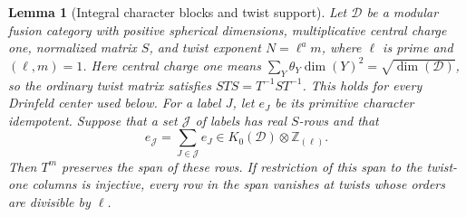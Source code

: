 \documentclass[11pt,a4paper]{article}
\newtheorem{lemma}[theorem]{Lemma}
\numberwithin{equation}{section}
\begin{document}
\begin{lemma}[Integral character blocks and twist support]
\label{lem:prime-local-block}
Let $\mathcal D$ be a modular fusion category with positive spherical
dimensions, multiplicative central charge one, normalized matrix $S$,
and twist exponent
$N=\ell^a m$, where $\ell$ is prime and $(\ell,m)=1$.
Here central charge one means
$\sum_Y\theta_Y\dim(Y)^2=\sqrt{\dim(\mathcal D)}$, so the ordinary
twist matrix satisfies $STS=T^{-1}ST^{-1}$. This holds for every
Drinfeld center used below. For a label $J$, let $e_J$ be its
primitive character idempotent.
Suppose that a set $\mathcal J$ of labels has real $S$-rows and that
\[
 e_{\mathcal J}=\sum_{J\in\mathcal J}e_J
       \in K_0(\mathcal D)\otimes\mathbb Z_{(\ell)}.
\]
Then $T^m$ preserves the span of these rows. If restriction of this
span to the twist-one columns is injective, every row in the span
vanishes at twists whose orders are divisible by $\ell$.
\end{lemma}
\end{document}

